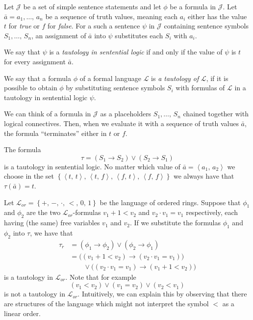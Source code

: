 \documentclass[../../main.tex]{subfiles}
\begin{document}
\begin{definition}[Tautology]\cite[pp.8, 24]{Cha90}
    Let $\mathcal{J}$ be a set of simple sentence statements and let $\phi$ be a formula in $\mathcal{J}$.
    Let $\bar{a} = a_1,\ldots,\, a_n$ be a sequence of truth values, meaning each $a_i$ either has the value $t$ for \textit{true} or $f$ for \textit{false}.
    For a such a sentence $\psi$ in $\mathcal{J}$ containing sentence symbols $S_1,\ldots,\, S_n$, 
    an assignment of $\bar{a}$ into $\psi$ substitutes each $S_i$ with $a_i$.

    We say that $\psi$ is a \textit{tautology in sentential logic} if and only if the value of $\psi$ is $t$ for every assignment $\bar{a}$.

    We say that a formula $\phi$ of a formal language $\mathcal{L}$ is \textit{a tautology of} $\mathcal{L}$, 
    if it is possible to obtain $\phi$ by substituting sentence symbols $S_i$ with formulas of $\mathcal{L}$ in a tautology in sentential logic $\psi$. 
\end{definition}

We can think of a formula in $\mathcal{J}$ as a placeholders $S_1,\ldots,\, S_n$ chained together with logical connectives.
Then, when we evaluate it with a sequence of truth values $\bar{a}$, the formula ``terminates'' either in $t$ or $f$.

\begin{example}
    The formula $$\tau = \left(S_1 \rightarrow S_2\right) \vee \left(S_2 \rightarrow S_1\right)$$
    is a tautology in sentential logic.
    No matter which value of $\bar{a} = \left<a_1,\, a_2\right>$ we choose in the set 
    $\left\{\left<t,\, t\right>,\, \left<t,\, f\right>,\, \left<f,\, t\right>,\, \left<f,\, f\right>\right\}$ 
    we always have that $\tau(\bar{a}) = t$.

    Let $\mathcal{L}_{or} = \left\{+,\, -,\, \cdot,\, <,\, 0,\, 1\right\}$ be the language of ordered rings.
    Suppose that $\phi_1$ and $\phi_2$ are the two $\mathcal{L}_{or}$-formulas $v_1 + 1 < v_2$ and $v_2 \cdot v_1 = v_1$ respectively,
    each having (the same) free variables $v_1$ and $v_2$.
    If we substitute the formulas $\phi_1$ and $\phi_2$ into $\tau$, we have that
    \begin{align*}
        \tau_r
        &= \left(\phi_1 \rightarrow \phi_2\right) \vee \left(\phi_2 \rightarrow \phi_1\right) \\
        &= \big(\left(v_1 + 1 < v_2\right) \rightarrow \left(v_2 \cdot v_1 = v_1\right)\big) \\
        &  \qquad \vee \big(\left(v_2 \cdot v_1 = v_1\right) \rightarrow \left(v_1 + 1 < v_2\right)\big)
    \end{align*}
    is a tautology in $\mathcal{L}_{or}$.
    Note that for example $$(v_1 < v_2) \vee (v_1 = v_2) \vee (v_2 < v_1)$$ is not a tautology in $\mathcal{L}_{or}$.
    Intuitively, we can explain this by observing that there are structures of the language which might not interpret the symbol $<$ as a linear order.
\end{example}
\end{document}
